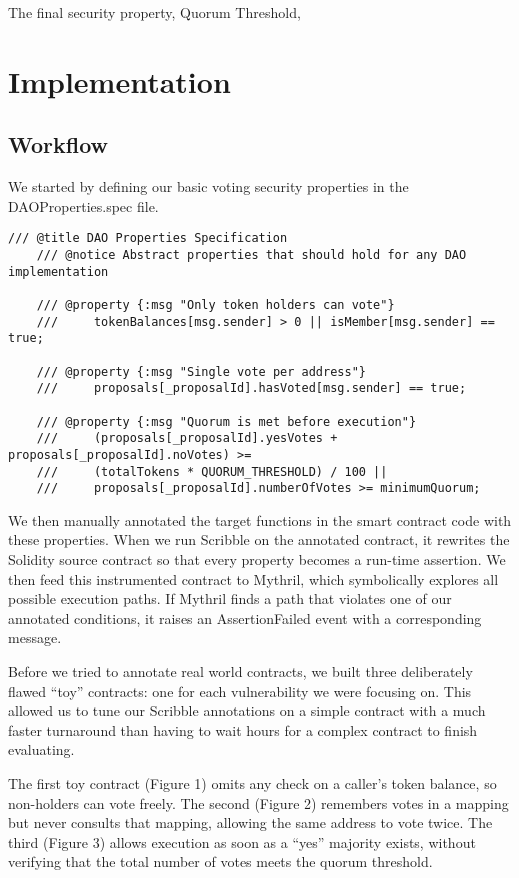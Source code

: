 \documentclass[conference]{IEEEtran}
\begin{document}
The final security property, Quorum Threshold, 

\section{Implementation}
\subsection{Workflow}

We started by defining our basic voting security properties in the DAOProperties.spec file. 

\begin{lstlisting}[basicstyle=\ttfamily\small,breaklines=true]
    /// @title DAO Properties Specification
    /// @notice Abstract properties that should hold for any DAO implementation

    /// @property {:msg "Only token holders can vote"} 
    ///     tokenBalances[msg.sender] > 0 || isMember[msg.sender] == true;

    /// @property {:msg "Single vote per address"} 
    ///     proposals[_proposalId].hasVoted[msg.sender] == true;

    /// @property {:msg "Quorum is met before execution"} 
    ///     (proposals[_proposalId].yesVotes + proposals[_proposalId].noVotes) >= 
    ///     (totalTokens * QUORUM_THRESHOLD) / 100 || 
    ///     proposals[_proposalId].numberOfVotes >= minimumQuorum;
\end{lstlisting}


We then manually annotated the target functions in the smart contract code with these properties. When we run Scribble on the annotated contract, it rewrites the Solidity source contract so that every property becomes a run-time assertion. We then feed this instrumented contract to Mythril, which symbolically explores all possible execution paths. If Mythril finds a path that violates one of our annotated conditions, it raises an AssertionFailed event with a corresponding message. 

Before we tried to annotate real world contracts, we built three deliberately flawed “toy” contracts: one for each vulnerability we were focusing on. This allowed us to tune our Scribble annotations on a simple contract with a much faster turnaround than having to wait hours for a complex contract to finish evaluating. 

The first toy contract (Figure 1) omits any check on a caller’s token balance, so non-holders can vote freely. The second (Figure 2) remembers votes in a mapping but never consults that mapping, allowing the same address to vote twice. The third (Figure 3) allows execution as soon as a “yes” majority exists, without verifying that the total number of votes meets the quorum threshold.
\end{document}
